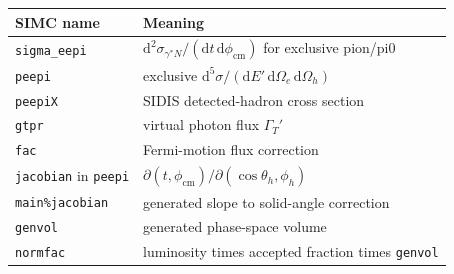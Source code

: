 \documentclass[11pt]{article}
\newcommand{\dd}{\mathrm{d}}
\newcommand{\phicm}{\phi_{\mathrm{cm}}}
\newcommand{\Escat}{E'}
\begin{document}
\begin{center}
\begin{tabular}{ll}
\hline
SIMC name & Meaning \\
\hline
\texttt{sigma\_eepi} & \(\dd^2\sigma_{\gamma^*N}/(\dd t\,\dd\phicm)\) for exclusive pion/pi0 \\
\texttt{peepi} & exclusive \(\dd^5\sigma/(\dd \Escat\,\dd\Omega_e\,\dd\Omega_h)\) \\
\texttt{peepiX} & SIDIS detected-hadron cross section \\
\texttt{gtpr} & virtual photon flux \(\Gamma_T'\) \\
\texttt{fac} & Fermi-motion flux correction \\
\texttt{jacobian} in \texttt{peepi} & \(\partial(t,\phicm)/\partial(\cos\theta_h,\phi_h)\) \\
\texttt{main\%jacobian} & generated slope to solid-angle correction \\
\texttt{genvol} & generated phase-space volume \\
\texttt{normfac} & luminosity times accepted fraction times \texttt{genvol} \\
\hline
\end{tabular}
\end{center}
\end{document}
